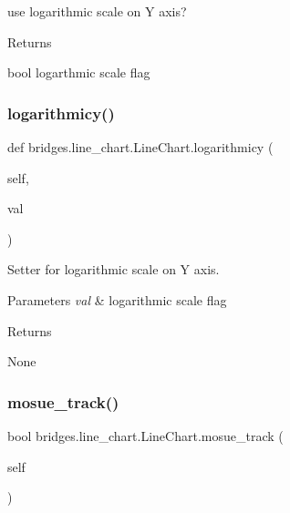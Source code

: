 use logarithmic scale on Y axis? 

\begin{DoxyReturn}{Returns}


bool logarthmic scale flag 
\end{DoxyReturn}
\mbox{\label{classbridges_1_1line__chart_1_1_line_chart_ac29eaedd760a3f608f7b11193befa1c5}} 
\subsubsection{\texorpdfstring{logarithmicy()}{logarithmicy()}\hspace{0.1cm}{\footnotesize\ttfamily [2/2]}}
{\footnotesize\ttfamily def bridges.\+line\+\_\+chart.\+Line\+Chart.\+logarithmicy (\begin{DoxyParamCaption}\item[{}]{self,  }\item[{}]{val }\end{DoxyParamCaption})}



Setter for logarithmic scale on Y axis. 


\begin{DoxyParams}{Parameters}
{\em val} & logarithmic scale flag \\
\hline
\end{DoxyParams}
\begin{DoxyReturn}{Returns}


None 
\end{DoxyReturn}
\mbox{\label{classbridges_1_1line__chart_1_1_line_chart_a524828aa8951e4e9a515ea20692fc654}} 
\subsubsection{\texorpdfstring{mosue\_track()}{mosue\_track()}\hspace{0.1cm}{\footnotesize\ttfamily [1/2]}}
{\footnotesize\ttfamily  bool bridges.\+line\+\_\+chart.\+Line\+Chart.\+mosue\+\_\+track (\begin{DoxyParamCaption}\item[{}]{self }\end{DoxyParamCaption})}



